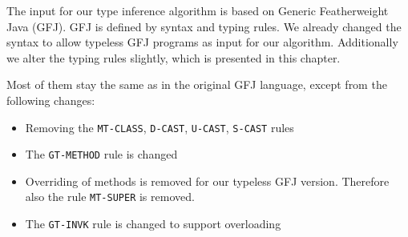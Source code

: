 The input for our type inference algorithm is based on Generic Featherweight Java (GFJ).
GFJ is defined by syntax and typing rules.
We already changed the syntax to allow typeless GFJ programs as input for our algorithm.
Additionally we alter the typing rules slightly, which is presented in this chapter.


Most of them stay the same as in the original GFJ language,
except from the following changes:
\begin{itemize}
\item Removing the \texttt{MT-CLASS}, \texttt{D-CAST}, \texttt{U-CAST}, \texttt{S-CAST} rules
\item The \texttt{GT-METHOD} rule is changed
\item Overriding of methods is removed for our typeless GFJ version. Therefore also the rule \texttt{MT-SUPER} is removed.
\item The \texttt{GT-INVK} rule is changed to support overloading
\end{itemize}


